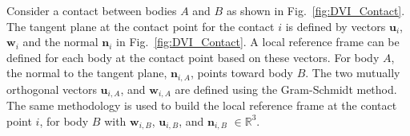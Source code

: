 Consider a contact between bodies $A$ and $B$ as shown in Fig.~\ref{fig:DVI_Contact}. The tangent plane at the contact point for the contact $i$ is defined by vectors $\textbf{u}_i$, $\textbf{w}_i$ and the normal $\textbf{n}_i$ in Fig.~\ref{fig:DVI_Contact}. A local reference frame can be defined for each body at the contact point based on these vectors. For body $A$, the normal to the tangent plane, $\textbf{n}_{i,A}$, points toward body $B$. The two mutually orthogonal vectors $\textbf{u}_{i,A}$, and $\textbf{w}_{i,A}$ are defined using the Gram-Schmidt method. The same methodology is used to build the local reference frame at the contact point $i$, for body $B$ with $\textbf{w}_{i,B}$, $\textbf{u}_{i,B}$, and $\textbf{n}_{i,B}$ $\in \mathbb{R}^3$. 




